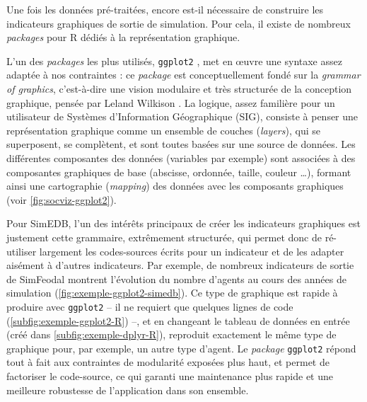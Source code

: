 Une fois les données pré-traitées, encore est-il nécessaire de construire les indicateurs graphiques de sortie de simulation.
Pour cela, il existe de nombreux \textit{packages} pour R dédiés à la représentation graphique.

L'un des \textit{packages} les plus utilisés, \texttt{ggplot2} \autocite{wickham_ggplot2_2016}, met en œuvre une syntaxe assez adaptée à nos contraintes : ce \textit{package} est conceptuellement fondé sur la \og \textit{grammar of graphics}\fg{}, c'est-à-dire une vision modulaire et très structurée de la conception graphique, pensée par Leland Wilkison \autocite{wilkinson_grammar_2006}.
La logique, assez familière pour un utilisateur de Systèmes d'Information Géographique (SIG), consiste à penser une représentation graphique comme un ensemble de couches (\textit{layers}), qui se superposent, se complètent, et sont toutes basées sur une source de données.
Les différentes composantes des données (variables par exemple) sont associées à des composantes graphiques de base (abscisse, ordonnée, taille, couleur \ldots), formant ainsi une \og cartographie\fg{} (\textit{mapping}) des données avec les composants graphiques (voir \cref{fig:socviz-ggplot2}).

Pour SimEDB, l'un des intérêts principaux de créer les indicateurs graphiques est justement cette grammaire, extrêmement structurée, qui permet donc de ré-utiliser largement les codes-sources écrits pour un indicateur et de les adapter aisément à d'autres indicateurs.
Par exemple, de nombreux indicateurs de sortie de SimFeodal montrent l'évolution du nombre d'agents au cours des années de simulation (\cref{fig:exemple-ggplot2-simedb}).
Ce type de graphique est rapide à produire avec \texttt{ggplot2} -- il ne requiert que quelques lignes de code (\cref{subfig:exemple-ggplot2-R}) --,
et en changeant le tableau de données en entrée (créé dans \cref{subfig:exemple-dplyr-R}), reproduit exactement le même type de graphique pour, par exemple, un autre type d'agent.
Le \textit{package} \texttt{ggplot2} répond tout à fait aux contraintes de modularité exposées plus haut, et permet de factoriser le code-source, ce qui garanti une maintenance plus rapide et une meilleure robustesse de l'application dans son ensemble.

\clearpage

